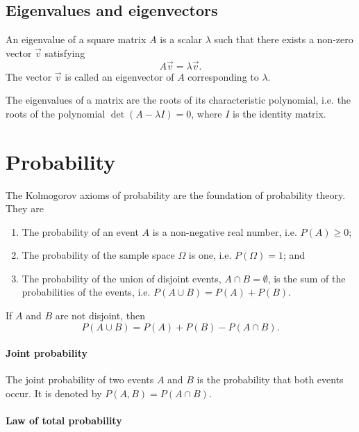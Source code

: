 \subsection{Eigenvalues and eigenvectors}

An eigenvalue of a square matrix $A$ is a scalar $\lambda$ such that there exists a
non-zero vector $\vec{v}$ satisfying
\begin{equation}
  \label{eq:eig}
  A \vec{v} = \lambda \vec{v}\text{.}
\end{equation}
The vector $\vec{v}$ is called an eigenvector of $A$ corresponding to $\lambda$.

The eigenvalues of a matrix are the roots of its characteristic polynomial, i.e. the
roots of the polynomial $\det(A - \lambda I) = 0$, where $I$ is the identity matrix.

\section{Probability}

The Kolmogorov axioms of probability are the foundation of probability theory.
They are
\begin{enumerate}
  \item The probability of an event $A$ is a non-negative real number, i.e. $P(A) \geq 0$;
  \item The probability of the sample space $\Omega$ is one, i.e. $P(\Omega) = 1$; and
  \item The probability of the union of disjoint events, $A \cap B = \emptyset$, is
    the sum of the probabilities of the events, i.e. $P(A \cup B) = P(A) + P(B)$.
\end{enumerate}

If $A$ and $B$ are not disjoint, then
\begin{equation*}
  P(A \cup B) = P(A) + P(B) - P(A \cap B)\text{.}
\end{equation*}

\paragraph{Joint probability}

The joint probability of two events $A$ and $B$ is the probability that both events
occur.  It is denoted by $P(A, B) = P(A \cap B)$.

\paragraph{Law of total probability}

